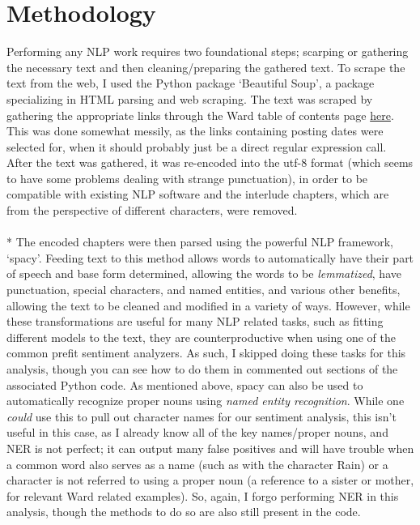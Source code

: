 \documentclass[11pt]{article}
\begin{document}
\section{Methodology}
\noindent
Performing any NLP work requires two foundational steps; scarping or gathering the necessary text and then cleaning/preparing the gathered text. To scrape the text from the web, I used the Python package `Beautiful Soup', a package specializing in HTML parsing and web scraping. The text was scraped by gathering the appropriate links through the Ward table of contents page \href{https://www.parahumans.net/table-of-contents/}{here}. This was done somewhat messily, as the links containing posting dates were selected for, when it should probably just be a direct regular expression call. After the text was gathered, it was re-encoded into the utf-8 format (which seems to have some problems dealing with strange punctuation), in order to be compatible with existing NLP software and the interlude chapters, which are from the perspective of different characters, were removed.  
\\
\\*
The encoded chapters were then parsed using the powerful NLP framework, `spacy'. Feeding text to this method allows words to automatically have their part of speech and base form determined, allowing the words to be \emph{lemmatized}, have punctuation, special characters, and named entities, and various other benefits, allowing the text to be cleaned and modified in a variety of ways.
However, while these transformations are useful for many NLP related tasks, such as fitting different models to the text, they are counterproductive when using one of the common prefit sentiment analyzers. As such, I skipped doing these tasks for this analysis, though you can see how to do them in commented out sections of the associated Python code. As mentioned above, spacy can also be used to automatically recognize proper nouns using \emph{named entity recognition}. While one \emph{could} use this to pull out character names for our sentiment analysis, this isn't useful in this case, as I already know all of the key names/proper nouns, and NER is not perfect; it can output many false positives and will have trouble when a common word also serves as a name (such as with the character Rain) or a character is not referred to using a proper noun (a reference to a sister or mother, for relevant Ward related examples). So, again, I forgo performing NER in this analysis, though the methods to do so are also still present in the code. 
\\
\end{document}
